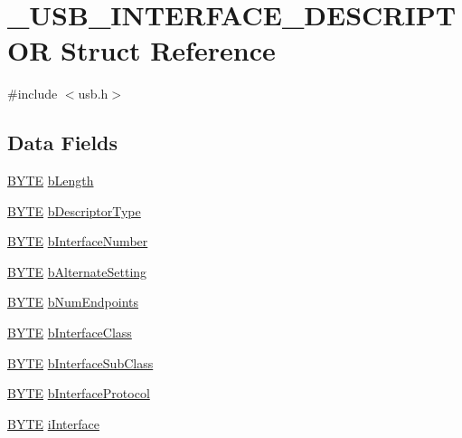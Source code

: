 \hypertarget{struct___u_s_b___i_n_t_e_r_f_a_c_e___d_e_s_c_r_i_p_t_o_r}{
\section{\_\-USB\_\-INTERFACE\_\-DESCRIPTOR Struct Reference}
\label{struct___u_s_b___i_n_t_e_r_f_a_c_e___d_e_s_c_r_i_p_t_o_r}
}


{\ttfamily \#include $<$usb.h$>$}

\subsection*{Data Fields}
\begin{DoxyCompactItemize}
\item 
\hyperlink{type_8h_a4ae1dab0fb4b072a66584546209e7d58}{BYTE} \hyperlink{struct___u_s_b___i_n_t_e_r_f_a_c_e___d_e_s_c_r_i_p_t_o_r_a8e443464272fdf3bd5148df0b7f5dcaf}{bLength}
\item 
\hyperlink{type_8h_a4ae1dab0fb4b072a66584546209e7d58}{BYTE} \hyperlink{struct___u_s_b___i_n_t_e_r_f_a_c_e___d_e_s_c_r_i_p_t_o_r_ac1d02ce6fe165032044fb81602a9b07c}{bDescriptorType}
\item 
\hyperlink{type_8h_a4ae1dab0fb4b072a66584546209e7d58}{BYTE} \hyperlink{struct___u_s_b___i_n_t_e_r_f_a_c_e___d_e_s_c_r_i_p_t_o_r_a6b085320481a18a2f60b08e1df8c3fb6}{bInterfaceNumber}
\item 
\hyperlink{type_8h_a4ae1dab0fb4b072a66584546209e7d58}{BYTE} \hyperlink{struct___u_s_b___i_n_t_e_r_f_a_c_e___d_e_s_c_r_i_p_t_o_r_a749103073cc05c78b6d58d8a08b6b0ea}{bAlternateSetting}
\item 
\hyperlink{type_8h_a4ae1dab0fb4b072a66584546209e7d58}{BYTE} \hyperlink{struct___u_s_b___i_n_t_e_r_f_a_c_e___d_e_s_c_r_i_p_t_o_r_af320b931ec8067dd32e27ba0e23e438a}{bNumEndpoints}
\item 
\hyperlink{type_8h_a4ae1dab0fb4b072a66584546209e7d58}{BYTE} \hyperlink{struct___u_s_b___i_n_t_e_r_f_a_c_e___d_e_s_c_r_i_p_t_o_r_a31f821b2cd1261dfad082a80005e39d5}{bInterfaceClass}
\item 
\hyperlink{type_8h_a4ae1dab0fb4b072a66584546209e7d58}{BYTE} \hyperlink{struct___u_s_b___i_n_t_e_r_f_a_c_e___d_e_s_c_r_i_p_t_o_r_a5ab5e6dcdab46eb97093490433d5325c}{bInterfaceSubClass}
\item 
\hyperlink{type_8h_a4ae1dab0fb4b072a66584546209e7d58}{BYTE} \hyperlink{struct___u_s_b___i_n_t_e_r_f_a_c_e___d_e_s_c_r_i_p_t_o_r_a2151ba09c8750aa287e6e58494d9c2d7}{bInterfaceProtocol}
\item 
\hyperlink{type_8h_a4ae1dab0fb4b072a66584546209e7d58}{BYTE} \hyperlink{struct___u_s_b___i_n_t_e_r_f_a_c_e___d_e_s_c_r_i_p_t_o_r_ac0fb618c55b8c62548531ed557fa8494}{iInterface}
\end{DoxyCompactItemize}



